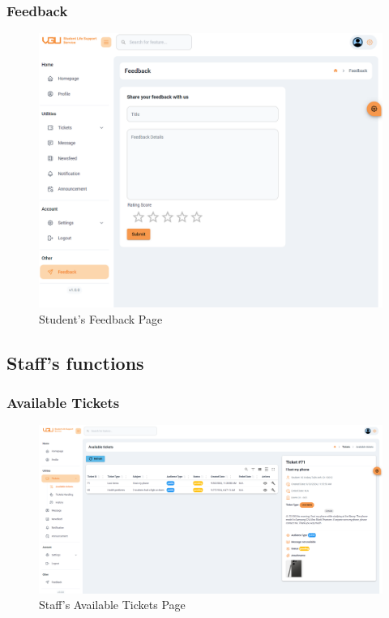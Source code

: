 	
	\subsubsection{Feedback}
	\begin{figure}[H]
		\centering
		\includegraphics[width=1.0\linewidth]{graphics/gui/student/feedback}
		\caption{Student's Feedback Page}
		\label{fig:gui-std-feedback}
	\end{figure}
	
	
\subsection{Staff's functions}

	\subsubsection{Available Tickets}
	\begin{figure}[H]
		\centering
		\includegraphics[width=1\linewidth]{graphics/gui/staff/avail-ticket}
		\caption{Staff's Available Tickets Page}
		\label{fig:gui-st-avail-ticket}
	\end{figure}
	
